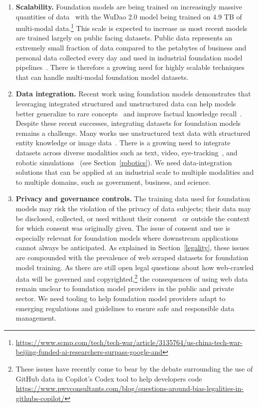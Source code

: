 \begin{enumerate}
    \item \textbf{Scalability.} Foundation models are being trained on increasingly massive quantities of data~\citep{kaplan2020} with the WuDao 2.0 model being trained on 4.9 TB of multi-modal data.\footnote{\url{https://www.scmp.com/tech/tech-war/article/3135764/us-china-tech-war-beijing-funded-ai-researchers-surpass-google-and}} This scale is expected to increase as most recent models are trained largely on public facing datasets. Public data represents an extremely small fraction of data compared to the petabytes of business and personal data collected every day and used in industrial foundation model pipelines~\citep{marr2017}. There is therefore a growing need for highly scalable techniques that can handle multi-modal foundation model datasets.

    \item \textbf{Data integration.} Recent work using foundation models demonstrates that leveraging integrated structured and unstructured data can help models better generalize to rare concepts~\citep{orr2020bootleg} and improve factual knowledge recall~\citep{orr2020bootleg, logeswaran2019entdesc, Zhang2019ERNIEEL, Peters2019KnowledgeEC,perner2020ebert}. Despite these recent successes, integrating datasets for foundation models remains a challenge. Many works use unstructured text data with structured entity knowledge or image data~\citep{antol2015vqa}. There is a growing need to integrate datasets across diverse modalities such as text, video, eye-tracking~\citep{hollenstein-etal-2020-zuco}, and robotic simulations~\citep{lynchlanguage} (see Section~\ref{robotics}). We need data-integration solutions that can be applied at an industrial scale to multiple modalities and to multiple domains, such as government, business, and science.

    \item \textbf{Privacy and governance controls.} The training data used for foundation models may risk the violation of the privacy of data subjects; their data may be disclosed, collected, or used without their consent~\citep{jo2020lessons} or outside the context for which consent was originally given. The issue of consent and use is especially relevant for foundation models where downstream applications cannot always be anticipated. As explained in Section~\ref{legality}, these issues are compounded with the prevalence of web scraped datasets for foundation model training. As there are still open legal questions about how web-crawled data will be governed and copyrighted,\footnote{These issues have recently come to bear by the debate surrounding the use of GitHub data in Copilot's Codex tool to help developers code \url{https://www.pwvconsultants.com/blog/questions-around-bias-legalities-in-githubs-copilot/}} the consequences of using web data remain unclear to foundation model providers in the public and private sector. We need tooling to help foundation model providers adapt to emerging regulations and guidelines to ensure safe and responsible data management.


\end{enumerate}
